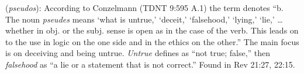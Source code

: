 \item[Falsehood,]

(\textit{pseudos}):
According to Conzelmann (TDNT 9:595 A.1) the term denotes ``b. The noun \emph{pseudes} means `what is untrue,' `deceit,' `falsehood,' `lying,' `lie,' \ldots whether in obj. or the subj. sense is open as in the case of the verb. This leads on to the use in logic on the one side and in the ethics on the other.'' The main focus is on deceiving and being untrue. \emph{Untrue} defines as ``not true; false,'' then \emph{falsehood} as ``a lie or a statement that is not correct.''
Found in Rev 21:27, 22:15.

